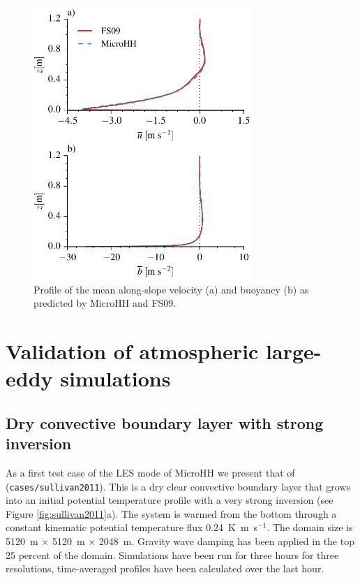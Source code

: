 \documentclass[gmd]{copernicus}
\begin{document}
\begin{figure}[t]
	\vspace*{2mm}
	\begin{center}
		\includegraphics[width=8.3cm]{figs/katabatic.pdf}
	\end{center}
	\caption{Profile of the mean along-slope velocity (a) and buoyancy (b) as predicted by MicroHH and FS09.}
	\label{fig:katabatic}
\end{figure}

\section{Validation of atmospheric large-eddy simulations}\label{sec:validation_atmos}
\subsection{Dry convective boundary layer with strong inversion}
As a first test case of the LES mode of MicroHH we present that of \citet{Sullivan2011} (\texttt{cases/sullivan2011}). This is a dry clear convective boundary layer that grows into an initial potential temperature profile with a very strong inversion (see Figure \ref{fig:sullivan2011}a). The system is warmed from the bottom through a constant kinematic potential temperature flux 0.24~K~m~s$^{-1}$. The domain size is 5120~m $\times$ 5120~m $\times$ 2048~m. Gravity wave damping has been applied in the top 25 percent of the domain. Simulations have been run for three hours for three resolutions, time-averaged profiles have been calculated over the last hour.
\end{document}
